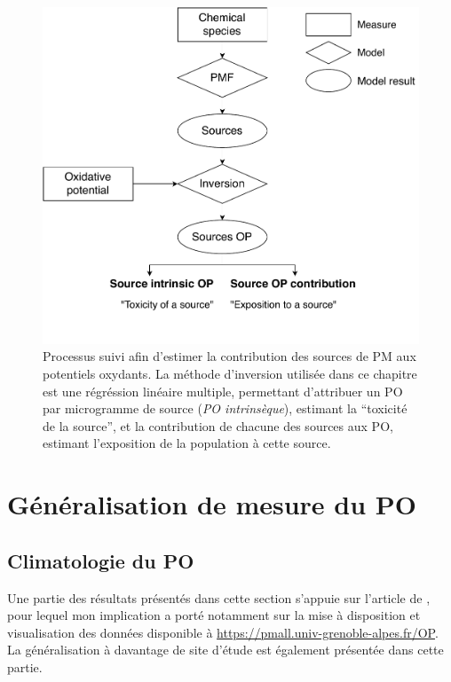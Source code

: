 \begin{figure}[ht]
    \centering
    \includegraphics[width=0.8\linewidth]{figures/chapter04/flowchart_inversion.pdf}
    \caption{Processus suivi afin d'estimer la contribution des sources de PM aux
        potentiels oxydants. La méthode d'inversion utilisée dans ce chapitre est une
        régréssion linéaire multiple, permettant d'attribuer un PO par microgramme de source
        (\textit{PO intrinsèque}), estimant la ``toxicité de la source'', et la contribution de
    chacune des sources aux PO, estimant l'exposition de la population à cette source.}%
    \label{fig:workflow_inversion}
\end{figure}


\section{Généralisation de mesure du PO}%
\label{sec:généralisation_de_mesure_du_po}

\subsection{Climatologie du PO}%
\label{sub:climatologie_du_po}

\begin{tcolorbox}[colback=red!5!white,colframe=Melon,title=Note]
    Une partie des résultats présentés dans cette section s'appuie sur l'article de
    \cite{calasSeasonal2019}, pour lequel mon implication a porté notamment sur la mise à
    disposition et visualisation des données disponible à
    \url{https://pmall.univ-grenoble-alpes.fr/OP}.\\
    La généralisation à davantage de site d'étude est également présentée dans cette
    partie.
\end{tcolorbox}


